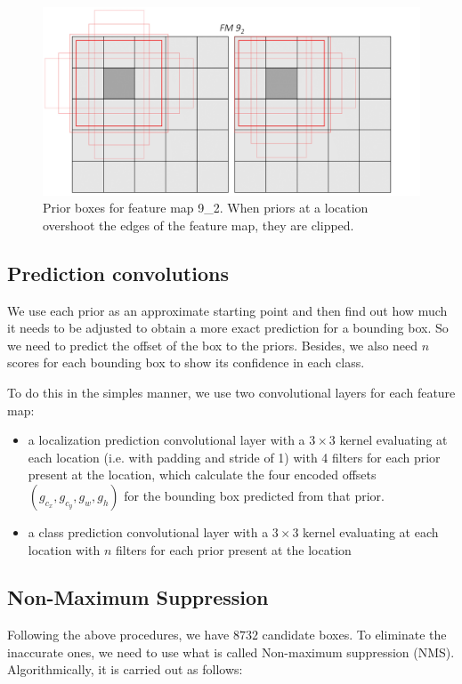 \documentclass[journal,conference]{IEEEtran}
\begin{document}
\begin{figure}[htbp]
  \centering
  \includegraphics[width=\linewidth]{fig/priors2.jpg}
  \caption{Prior boxes for feature map 9\_2. When priors at a location overshoot the edges of the feature map, they are clipped.}\label{fig:prior}
\end{figure}

\subsection{Prediction convolutions}
We use each prior as an approximate starting point and then find out how much it needs to be adjusted to obtain a more exact prediction for a bounding box. So we need to predict the offset of the box to the priors. Besides, we also need $n$ scores for each bounding box to show its confidence in each class.

To do this in the simples manner, we use two convolutional layers for each feature map:
\begin{itemize}
  \item a localization prediction convolutional layer with a $3\times 3$ kernel evaluating at each location (i.e. with padding and stride of 1) with 4 filters for each prior present at the location, which calculate the four encoded offsets $(g_{c_x}, g_{c_y}, g_w, g_h)$ for the bounding box predicted from that prior.

  \item a class prediction convolutional layer with a $3\times 3$ kernel evaluating at each location  with $n$ filters for each prior present at the location
\end{itemize}

\subsection{Non-Maximum Suppression}
Following the above procedures, we have $8732$ candidate boxes. To eliminate the inaccurate ones, we need to use what is called Non-maximum suppression (NMS). Algorithmically, it is carried out as follows:
\end{document}
